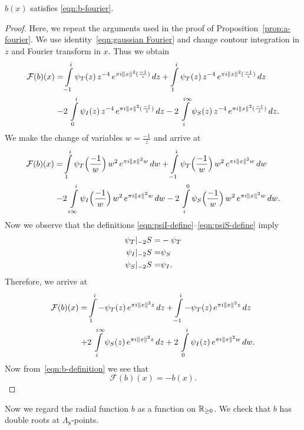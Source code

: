 \begin{proposition}\label{prop:b-fourier}
$b(x)$ satisfies \eqref{eqn:b-fourier}.
\end{proposition}
\begin{proof}
Here, we repeat the arguments used in the proof of Proposition~\ref{prop:a-fourier}.
We use identity~\eqref{eqn:gaussian Fourier} and change contour integration in $z$ and Fourier transform in $x$. Thus we obtain
\begin{align}
    \mathcal{F}(b)(x)= & \int\limits_{-1}^{i}\psi_T(z)\,z^{-4}\,e^{\pi i \|x\|^2 (\frac{-1}{z})}\,dz
        + \int\limits_{1}^{i}\psi_T(z)\,z^{-4}\,e^{\pi i \|x\|^2 (\frac{-1}{z})}\,dz \notag \\
    -& 2\,\int\limits_{0}^{i}\psi_I(z)\,z^{-4}\,e^{\pi i \|x\|^2 (\frac{-1}{z})}\,dz
    - 2\,\int\limits_{i}^{i\infty}\psi_S(z)\,z^{-4}\,e^{\pi i \|x\|^2 (\frac{-1}{z})}\,dz. \notag
\end{align}
We make the change of variables $w=\frac{-1}{z}$ and arrive at
\begin{align}
    \mathcal{F}(b)(x)= & \int\limits_{1}^{i}\psi_T\Big(\frac{-1}{w}\Big)\,w^{2}\,e^{\pi i \|x\|^2 w}\,dw
        + \int\limits_{-1}^{i}\psi_T\Big(\frac{-1}{w}\Big)\,w^{2}\,e^{\pi i \|x\|^2 w}\,dw \notag \\
    -& 2\,\int\limits_{i\infty}^{i}\psi_I\Big(\frac{-1}{w}\Big)\,w^{2}\,e^{\pi i \|x\|^2 w}\,dw
    - 2\,\int\limits_{i}^{0}\psi_S\Big(\frac{-1}{w}\Big)\,w^{2}\,e^{\pi i \|x\|^2 w}\,dw.\notag
\end{align}
Now we observe that the definitions \eqref{eqn:psiI-define}--\eqref{eqn:psiS-define} imply
\begin{align}
    \psi_T|_{-2}S=&-\psi_T \notag \\
    \psi_I|_{-2}S=&\psi_S \notag \\
    \psi_S|_{-2}S=&\psi_I. \notag
\end{align}
Therefore, we arrive at
\begin{align}
    \mathcal{F}(b)(x)= & \int\limits_{1}^{i}-\psi_T(z)\,e^{\pi i \|x\|^2 z}\,dz
        + \int\limits_{-1}^{i}-\psi_T(z)\,e^{\pi i \|x\|^2 z}\,dz \notag \\
    +& 2\,\int\limits_{i}^{i\infty}\psi_S(z)\,e^{\pi i \|x\|^2 z}\,dz
    + 2\,\int\limits_{0}^{i}\psi_I(z)\,e^{\pi i \|x\|^2 w}\,dw.\notag
\end{align}
Now from~\eqref{eqn:b-definition} we see that
$$ \mathcal{F}(b)(x)=-b(x). $$
\end{proof}
Now we regard the radial function $b$ as a function on $\mathbb{R}_{\geq0}$. We check that $b$ has double roots at $\Lambda_8$-points.

